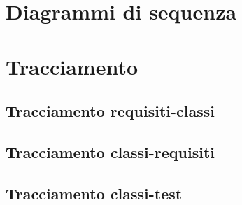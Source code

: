 \documentclass[a4paper]{article}
\begin{document}
	\section{Diagrammi di sequenza}
	
	\newpage
	
	\section{Tracciamento}
	
	\subsection{Tracciamento requisiti-classi}
	
	\subsection{Tracciamento classi-requisiti}
	
	\subsection{Tracciamento classi-test}

		
	\newpage 
	
	\cleardoublepage
	\listoffigures
	
	\cleardoublepage
	\listoftables
		
\end{document}
